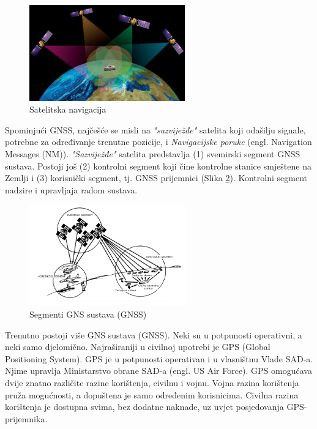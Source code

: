 \documentclass[a4paper,twoside,12pt]{memoir} %
\begin{document}
	\begin{figure}[h]
		\centering
		\includegraphics[width=0.6\textwidth]{pictureNav}
		\caption{Satelitska navigacija\cite{bookProcessing} }
		\label{Fig:nn}
		
	\end{figure}
	Spominjući GNSS, najčešće se misli na \textit{"sazviježđe"}
	satelita koji odašilju signale, potrebne za određivanje trenutne pozicije, i \textit{Navigacijske poruke} (engl. Navigation Messages (NM)).
	\textit{"Sazviježđe"} satelita predstavlja (1) svemirski segment GNSS sustava.
	Postoji još (2) kontrolni segment koji čine kontrolne stanice smještene na Zemlji i (3) korisnički segment, tj. GNSS prijemnici (Slika \ref{Fig:GNSSsegmenti}).
	Kontrolni segment nadzire i upravljaja radom sustava.
	
	\begin{figure}[h]
			\centering
			\includegraphics[width=0.6\textwidth]{GNSSsegmenti}
			\caption{Segmenti GNS sustava (GNSS)} %
			\label{Fig:GNSSsegmenti}
			
	\end{figure}
	
	Trenutno postoji više GNS sustava (GNSS). Neki su u potpunosti 
	operativni, a neki samo djelomično.
	Najraširaniji u civilnoj upotrebi je GPS (Global Positioning System).
	GPS je u potpunosti operativan i u vlasništnu Vlade SAD-a. Njime upravlja Ministarstvo obrane SAD-a (engl. US Air Force).
	GPS omogućava dvije znatno različite razine korištenja, civilnu i vojnu.
	Vojna razina korištenja pruža mogućnosti, a dopuštena je samo određenim 
	korisnicima. Civilna razina korištenja je dostupna svima, bez dodatne naknade, uz uvjet posjedovanja GPS-prijemnika. 
	
\end{document}
